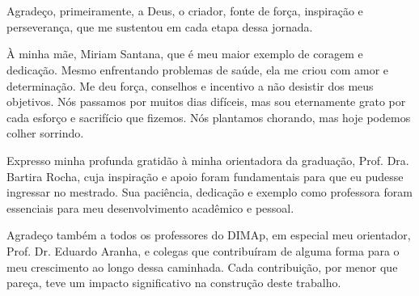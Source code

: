\chapter*{\agradecimentosnome}

Agradeço, primeiramente, a Deus, o criador, fonte de força, inspiração e perseverança, que me sustentou em cada etapa dessa jornada.

À minha mãe, Miriam Santana, que é meu maior exemplo de coragem e dedicação. Mesmo enfrentando problemas de saúde, ela me criou com amor e determinação. Me deu força, conselhos e incentivo a não desistir dos meus objetivos. Nós passamos por muitos dias difíceis, mas sou eternamente grato por cada esforço e sacrifício que fizemos. Nós plantamos chorando, mas hoje podemos colher sorrindo.

Expresso minha profunda gratidão à minha orientadora da graduação, Prof. Dra. Bartira Rocha, cuja inspiração e apoio foram fundamentais para que eu pudesse ingressar no mestrado. Sua paciência, dedicação e exemplo como professora foram essenciais para meu desenvolvimento acadêmico e pessoal.

Agradeço também a todos os professores do DIMAp, em especial meu orientador, Prof. Dr. Eduardo Aranha, e colegas que contribuíram de alguma forma para o meu crescimento ao longo dessa caminhada. Cada contribuição, por menor que pareça, teve um impacto significativo na construção deste trabalho.

\newpage
